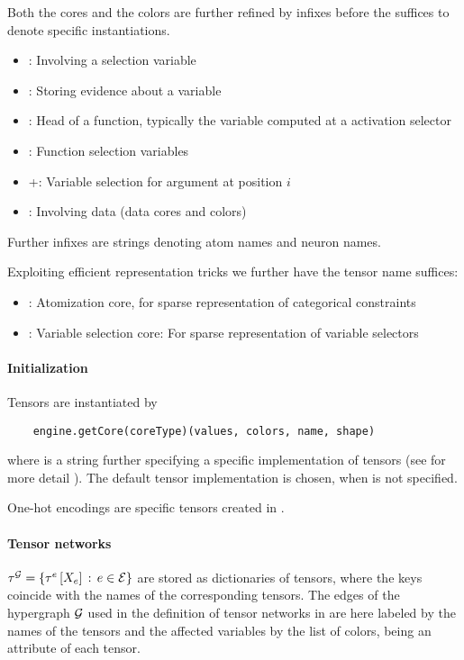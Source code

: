 Both the cores and the colors are further refined by infixes before the suffices to denote specific instantiations.

\begin{itemize}
    \item \selCoreIn: Involving a selection variable
    \item \eviCoreIn: Storing evidence about a variable
    \item \heaIn: Head of a function, typically the variable computed at a activation selector
    \item \funIn: Function selection variables
    \item \posIn+: Variable selection for argument at position $i$
    \item \datIn: Involving data (data cores and colors)
\end{itemize}

Further infixes are strings denoting atom names and neuron names.

Exploiting efficient representation tricks we further have the tensor name suffices:
\begin{itemize}
    \item \atoCoreSuf: Atomization core, for sparse representation of categorical constraints
    \item \vselCoreSuf: Variable selection core: For sparse representation of variable selectors
\end{itemize}

\paragraph{Initialization}
Tensors are instantiated by
\begin{lstlisting}
	engine.getCore(coreType)(values, colors, name, shape)
\end{lstlisting}
where  is a string further specifying a specific implementation of tensors (see for more detail ).
The default tensor implementation  is chosen, when  is not specified.


One-hot encodings are specific tensors created in \sprepresentation.

\subsect{\bncontractions}

\paragraph{Tensor networks} $\tau^{\mathcal{G}}=\{\tau^{e}\left[X_{e}\right]\,:\,e\in\mathcal{E}\}$ are stored as dictionaries of tensors, where the keys coincide with the names of the corresponding tensors.
The edges of the hypergraph $\mathcal{G}$ used in the definition of tensor networks in  are here labeled by the names of the tensors and the affected variables by the list of colors, being an attribute of each tensor.

